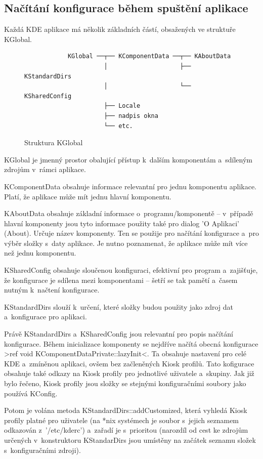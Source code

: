 \subsection{Načítání konfigurace během spuštění aplikace}
Každá KDE aplikace má několik základních částí, obsažených ve struktuře KGlobal.

\begin{figure}[h]
    \centering
    \begin{verbatim}
            KGlobal ──┬── KComponentData ──┬── KAboutData
                      │                    ├── KStandardDirs
                      │                    └── KSharedConfig
                      ├── Locale
                      ├── nadpis okna
                      └── etc.
    \end{verbatim}
    \caption{Struktura KGlobal}
    \label{fig:kglobal}
\end{figure}

KGlobal je jmenný prostor obalující přístup k~dalším komponentám a~sdíleným
zdrojům v~rámci aplikace.

KComponentData obsahuje informace relevantní pro jednu komponentu aplikace.
Platí, že aplikace může mít jednu hlavní komponentu.

KAboutData obsahuje základní informace o~programu/komponentě -- v~případě hlavní
komponenty jsou tyto informace použity také pro dialog 'O Aplikaci' (About).
Určuje název komponenty. Ten se použije pro načítání konfigurace a~pro výběr
složky s~daty aplikace. Je nutno poznamenat, že aplikace může mít více než jednu
komponentu.

KSharedConfig obsahuje sloučenou konfiguraci, efektivní pro program a~zajišťuje,
že konfigurace je sdílena mezi komponentami -- šetří se tak pamětí a~časem
nutným k~načtení konfigurace.

KStandardDirs slouží k~určení, které složky budou použity jako zdroj dat
a~konfigurace pro aplikaci.

Právě KStandardDirs a~KSharedConfig jsou relevantní pro popis načítání
konfigurace. Během inicializace komponenty se nejdříve načítá obecná konfigurace
>ref void KComponentDataPrivate::lazyInit<. Ta obsahuje nastavení pro celé KDE
a~zmíněnou aplikaci, ovšem bez začleněných Kiosk profilů. Tato kofigurace
obsahuje také odkazy na Kiosk profily pro jednotlivé uživatele a~skupiny. Jak
již bylo řečeno, Kiosk profily jsou složky se stejnými konfiguračními soubory
jako používá KConfig.

Potom je volána metoda KStandardDirs::addCustomized, která vyhledá Kiosk profily
platné pro uživatele (na *nix systémech je soubor s~jejich seznamem odkazován
z~'/etc/kderc') a~zařadí je s~prioritou (narozdíl od cest ke zdrojům určených
v~konstruktoru KStandarDirs jsou umístěny na začátek seznamu složek
s~konfiguračními zdroji).

